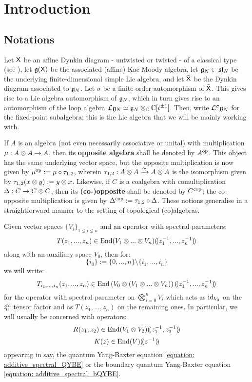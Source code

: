 \section{Introduction}
    \subsection{Notations}
        Let $\mathsf{X}$ be an affine Dynkin diagram - untwisted or twisted - of a classical type (see \cite[Chapter 4, Tables Aff 2 and 3, p. 55]{kac_infinite_dimensional_lie_algebras}), let $\mathfrak{g}(\mathsf{X})$ be the associated (affine) Kac-Moody algebra, let $\mathfrak{g}_N \subset \mathfrak{sl}_N$ be the underlying finite-dimensional simple Lie algebra, and let $\bar{\mathsf{X}}$ be the Dynkin diagram associated to $\mathfrak{g}_N$. Let $\sigma$ be a finite-order automorphism of $\bar{\mathsf{X}}$. This gives rise to a Lie algebra automorphism of $\mathfrak{g}_N$, which in turn gives rise to an automorphism of the loop algebra $\Loop\g_N \cong \g_N \tensor_{\bbC} \bbC[t^{\pm 1}]$. Then, write $\mathcal{L}^{\sigma}\mathfrak{g}_N$ for the fixed-point subalgebra; this is the Lie algebra that we will be mainly working with.

        If $A$ is an algebra (not even necessarily associative or unital) with multiplication $\mu: A \tensor A \to A$, then its \textbf{opposite algebra} shall be denoted by $A^{\mathrm{op}}$. This object has the same underlying vector space, but the opposite multiplication is now given by $\mu^{\mathrm{op}} := \mu \circ \tau_{1, 2}$, wherein $\tau_{1, 2}: A \tensor A \xrightarrow[]{\cong} A \tensor A$ is the isomorphism given by $\tau_{1, 2}(x \tensor y) := y \tensor x$. Likewise, if $C$ is a coalgebra with comultiplication $\Delta: C \to C \tensor C$, then its \textbf{(co-)opposite} shall be denoted by $C^{\mathrm{cop}}$; the co-opposite multiplication is given by $\Delta^{\mathrm{cop}} := \tau_{1, 2} \circ \Delta$. These notions generalise in a straightforward manner to the setting of topological (co)algebras.

        Given vector spaces $\{V_i\}_{1 \leq i \leq n}$ and an operator with spectral parameters:
            $$T(z_1, ..., z_n) \in \End(V_1 \tensor ... \tensor V_n)(\!(z_1^{-1}, ..., z_n^{-1})\!)$$
        along with an auxiliary space $V_0$, then for:
            $$\{i_0\} := \{0, ..., n\} \setminus \{i_1, ..., i_n\}$$
        we will write:
            $$T_{i_1, ..., i_n}(z_1, ..., z_n) \in \End\left(V_0 \tensor (V_1 \tensor ... \tensor V_n)\right)(\!(z_1^{-1}, ..., z_n^{-1})\!)$$
        for the operator with spectral parameter on $\bigotimes_{i = 0}^n V_i$ which acts as $\mathrm{id}_{V_0}$ on the $i_0^{th}$ tensor factor and as $T(z_1, ..., z_n)$ on the remaining ones. In particular, we will usually be concerned with operators:
            $$R(z_1, z_2) \in \End(V_1 \tensor V_2)(\!(z_1^{-1}, z_2^{-1})\!)$$
            $$K(z) \in \operatorname{End}(V)(\!(z^{-1})\!)$$
        appearing in say, the quantum Yang-Baxter equation \eqref{equation: additive_spectral_QYBE} or the boundary quantum Yang-Baxter equation \eqref{equation: additive_spectral_bQYBE}.

